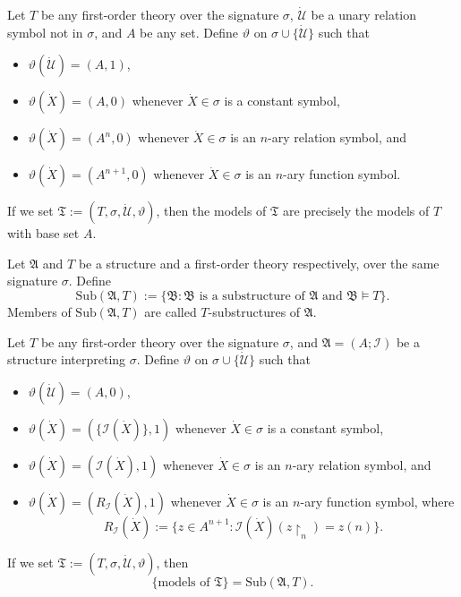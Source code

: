 \documentclass[12pt]{article}
\numberwithin{equation}{section}
\begin{document}
\begin{ex}
Let $T$ be any first-order theory over the signature $\sigma$, $\dot{\mathcal{U}}$ be a unary relation symbol not in $\sigma$, and $A$ be any set. Define $\vartheta$ on $\sigma \cup \{\dot{\mathcal{U}}\}$ such that
\begin{itemize}
    \item $\vartheta(\dot{\mathcal{U}}) = (A, 1)$,
    \item $\vartheta(\dot{X}) = (A, 0)$ whenever $\dot{X} \in \sigma$ is a constant symbol,
    \item $\vartheta(\dot{X}) = (A^n, 0)$ whenever $\dot{X} \in \sigma$ is an $n$-ary relation symbol, and
    \item  $\vartheta(\dot{X}) = (A^{n+1}, 0)$ whenever $\dot{X} \in \sigma$ is an $n$-ary function symbol.
\end{itemize}
If we set $\mathfrak{T} := (T, \sigma, \dot{\mathcal{U}}, \vartheta)$, then the models of $\mathfrak{T}$ are precisely the models of $T$ with base set $A$.
\end{ex}

\begin{defi}
Let $\mathfrak{A}$ and $T$ be a structure and a first-order theory respectively, over the same signature $\sigma$. Define $$\mathrm{Sub}(\mathfrak{A}, T) := \{\mathfrak{B} : \mathfrak{B} \text{ is a substructure of } \mathfrak{A} \text{ and } \mathfrak{B} \models T\}.$$ Members of $\mathrm{Sub}(\mathfrak{A}, T)$ are called $T$-substructures of $\mathfrak{A}$.
\end{defi}

\begin{ex}\label{2ndex}
Let $T$ be any first-order theory over the signature $\sigma$, and $\mathfrak{A} = (A; \mathcal{I})$ be a structure interpreting $\sigma$. Define $\vartheta$ on $\sigma \cup \{\dot{\mathcal{U}}\}$ such that
\begin{itemize}
    \item $\vartheta(\dot{\mathcal{U}}) = (A, 0)$,
    \item $\vartheta(\dot{X}) = (\{\mathcal{I}(\dot{X})\}, 1)$ whenever $\dot{X} \in \sigma$ is a constant symbol,
    \item $\vartheta(\dot{X}) = (\mathcal{I}(\dot{X}), 1)$ whenever $\dot{X} \in \sigma$ is an $n$-ary relation symbol, and
    \item  $\vartheta(\dot{X}) = (R_{\mathcal{I}}(\dot{X}), 1)$ whenever $\dot{X} \in \sigma$ is an $n$-ary function symbol, where $$R_{\mathcal{I}}(\dot{X}) := \{z \in A^{n+1} : \mathcal{I}(\dot{X})(z \! \restriction_n) = z(n)\}.$$
\end{itemize}
If we set $\mathfrak{T} := (T, \sigma, \dot{\mathcal{U}}, \vartheta)$, then $$\{ \text{models of } \mathfrak{T}\} = \mathrm{Sub}(\mathfrak{A}, T).$$
\end{ex}
\end{document}
